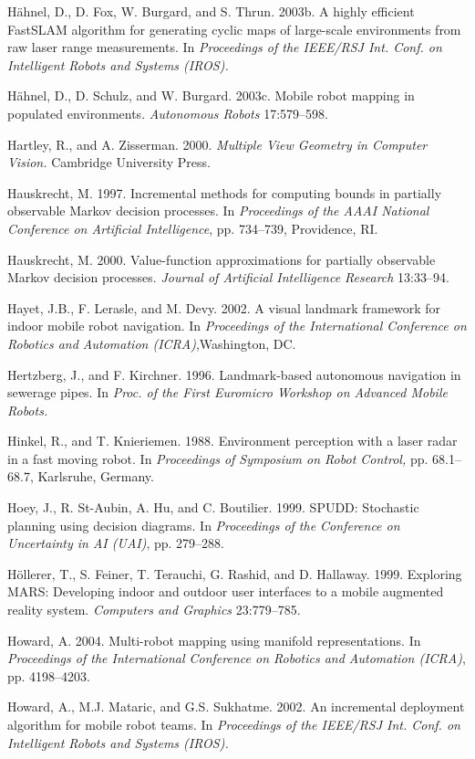 \documentclass[10pt,a4paper]{article}
\begin{document}
Hähnel, D., D. Fox, W. Burgard, and S. Thrun. 2003b. A highly efficient FastSLAM
algorithm for generating cyclic maps of large-scale environments from raw laser
range measurements. In \textit{Proceedings of the IEEE/RSJ Int. Conf. on Intelligent Robots
and Systems (IROS).}

Hähnel, D., D. Schulz, and W. Burgard. 2003c. Mobile robot mapping in populated
environments. \textit{Autonomous Robots} 17:579–598.

Hartley, R., and A. Zisserman. 2000. \textit{Multiple View Geometry in Computer Vision.} Cambridge
University Press.

Hauskrecht, M. 1997. Incremental methods for computing bounds in partially observable
Markov decision processes. In \textit{Proceedings of the AAAI National Conference
on Artificial Intelligence}, pp. 734–739, Providence, RI.

Hauskrecht, M. 2000. Value-function approximations for partially observable Markov
decision processes. \textit{Journal of Artificial Intelligence Research }13:33–94.

Hayet, J.B., F. Lerasle, and M. Devy. 2002. A visual landmark framework for indoor
mobile robot navigation. In \textit{Proceedings of the International Conference on Robotics and
Automation (ICRA)},Washington, DC.

Hertzberg, J., and F. Kirchner. 1996. Landmark-based autonomous navigation in
sewerage pipes. In \textit{Proc. of the First Euromicro Workshop on Advanced Mobile Robots.}

Hinkel, R., and T. Knieriemen. 1988. Environment perception with a laser radar in
a fast moving robot. In \textit{Proceedings of Symposium on Robot Control,} pp. 68.1–68.7,
Karlsruhe, Germany.

Hoey, J., R. St-Aubin, A. Hu, and C. Boutilier. 1999. SPUDD: Stochastic planning
using decision diagrams. In \textit{Proceedings of the Conference on Uncertainty in AI (UAI)},
pp. 279–288.

Höllerer, T., S. Feiner, T. Terauchi, G. Rashid, and D. Hallaway. 1999. Exploring
MARS: Developing indoor and outdoor user interfaces to a mobile augmented reality
system. \textit{Computers and Graphics} 23:779–785.

Howard, A. 2004. Multi-robot mapping using manifold representations. In \textit{Proceedings
of the International Conference on Robotics and Automation (ICRA)}, pp. 4198–4203.

Howard, A., M.J. Mataric, and G.S. Sukhatme. 2002. An incremental deployment
algorithm for mobile robot teams. In \textit{Proceedings of the IEEE/RSJ Int. Conf. on Intelligent
Robots and Systems (IROS).}
\end{document}
